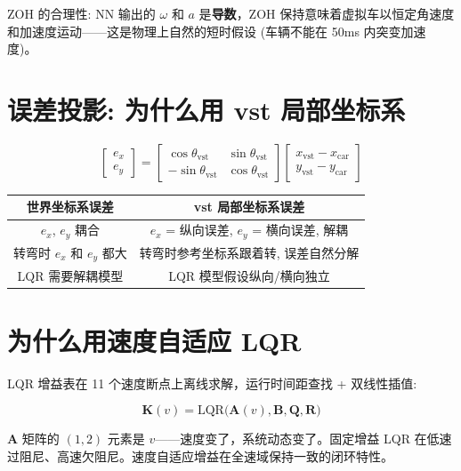 \documentclass[11pt,a4paper]{article}
\begin{document}
ZOH 的合理性: NN 输出的 $\omega$ 和 $a$ 是\textbf{导数}，ZOH 保持意味着虚拟车以恒定角速度和加速度运动——这是物理上自然的短时假设 (车辆不能在 50ms 内突变加速度)。

\section{误差投影: 为什么用 vst 局部坐标系}

\begin{equation}
\begin{bmatrix} e_x \\ e_y \end{bmatrix} =
\begin{bmatrix}
\cos\theta_{\text{vst}} & \sin\theta_{\text{vst}} \\
-\sin\theta_{\text{vst}} & \cos\theta_{\text{vst}}
\end{bmatrix}
\begin{bmatrix}
x_{\text{vst}} - x_{\text{car}} \\
y_{\text{vst}} - y_{\text{car}}
\end{bmatrix}
\end{equation}

\begin{center}
\begin{tabular}{c|c}
\toprule
世界坐标系误差 & vst 局部坐标系误差 \\
\midrule
$e_x$, $e_y$ 耦合 & $e_x$ = 纵向误差, $e_y$ = 横向误差, 解耦 \\
转弯时 $e_x$ 和 $e_y$ 都大 & 转弯时参考坐标系跟着转, 误差自然分解 \\
LQR 需要解耦模型 & LQR 模型假设纵向/横向独立 \\
\bottomrule
\end{tabular}
\end{center}

\section{为什么用速度自适应 LQR}

LQR 增益表在 11 个速度断点上离线求解，运行时间距查找 + 双线性插值:

\begin{equation}
\mathbf{K}(v) = \text{LQR}\big(\mathbf{A}(v), \mathbf{B}, \mathbf{Q}, \mathbf{R}\big)
\end{equation}

$\mathbf{A}$ 矩阵的 $(1,2)$ 元素是 $v$——速度变了，系统动态变了。固定增益 LQR 在低速过阻尼、高速欠阻尼。速度自适应增益在全速域保持一致的闭环特性。
\end{document}
